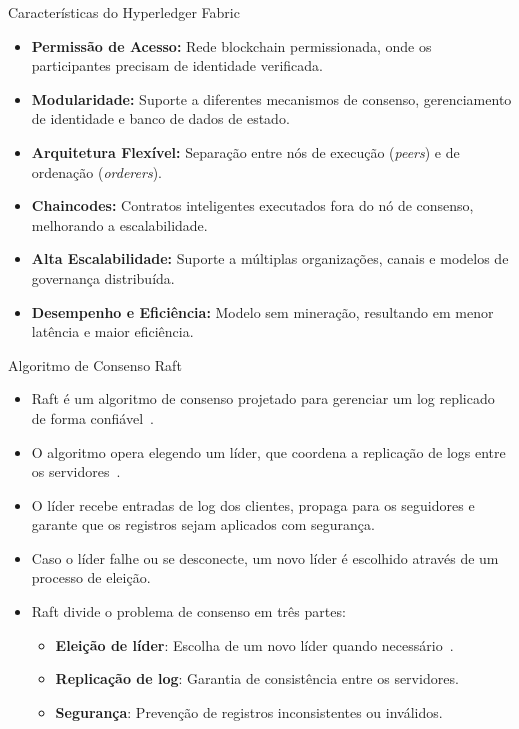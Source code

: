 \begin{frame}{Características do Hyperledger Fabric}

	\begin{itemize}
		\item \textbf{Permissão de Acesso:} Rede blockchain permissionada, onde os
		      participantes precisam de identidade verificada.
		\item \textbf{Modularidade:} Suporte a diferentes mecanismos de consenso,
		      gerenciamento de identidade e banco de dados de estado.
		\item \textbf{Arquitetura Flexível:} Separação entre nós de execução
		      (\textit{peers}) e de ordenação (\textit{orderers}).
		\item \textbf{Chaincodes:} Contratos inteligentes executados fora do nó de
		      consenso, melhorando a escalabilidade.
		\item \textbf{Alta Escalabilidade:} Suporte a múltiplas organizações, canais
		      e modelos de governança distribuída.
		\item \textbf{Desempenho e Eficiência:} Modelo sem mineração, resultando em
		      menor latência e maior eficiência.
	\end{itemize}

\end{frame}

\begin{frame}{Algoritmo de Consenso Raft}

	\begin{itemize}
		\item Raft é um algoritmo de consenso projetado para gerenciar um log
		      replicado de forma confiável~\cite{raft}.
		\item O algoritmo opera elegendo um líder, que coordena a replicação de logs
		      entre os servidores~\cite{ongaro2014raft}.
		\item O líder recebe entradas de log dos clientes, propaga para os
		      seguidores e garante que os registros sejam aplicados com segurança.
		\item Caso o líder falhe ou se desconecte, um novo líder é escolhido através
		      de um processo de eleição.
		\item Raft divide o problema de consenso em três partes:
		      \begin{itemize}
			      \item \textbf{Eleição de líder}: Escolha de um novo líder quando
			            necessário~\cite{ongaro2014raft}.
			      \item \textbf{Replicação de log}: Garantia de consistência entre os
			            servidores.
			      \item \textbf{Segurança}: Prevenção de registros inconsistentes ou
			            inválidos.
		      \end{itemize}
	\end{itemize}

\end{frame}

